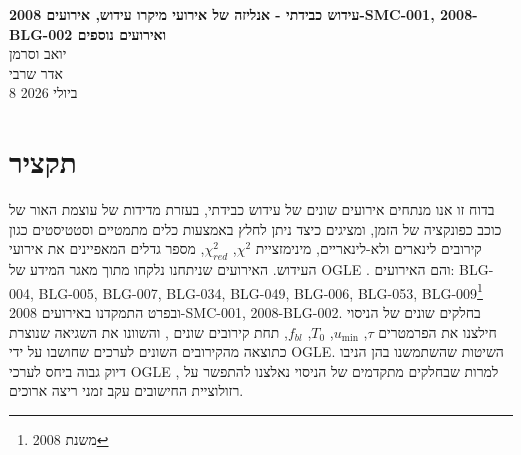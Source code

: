 \documentclass{article}
\begin{document}
\noindent
{\LARGE \textbf{
עידוש כבידתי - אנליזה של אירועי מיקרו עידוש, אירועים
\mbox{2008-SMC-001},
\mbox{2008-BLG-002}
ואירועים נוספים 
}} \\[0.5cm]
{\large יואב וסרמן
\noindent\\
אדר שרבי}\\
{\large 8 ביולי 2026}\\

\section*{תקציר}
בדוח זו אנו מנתחים אירועים שונים של עידוש כבידתי, בעזרת מדידות של עוצמת האור של כוכב כפונקציה של הזמן, ומציגים כיצד ניתן לחלץ באמצעות כלים מתמטיים וסטטיסטים
כגון קירובים לינארים ולא-לינאריים, מינימזציית
$\chi^2$,
$\chi^2_{red}$,
 מספר גדלים המאפיינים את אירועי העידוש.
האירועים שניתחנו נלקחו מתוך מאגר המידע של
\textenglish{OGLE}
\cite{ogle_general_data}.
והם האירועים:
\mbox{BLG-004}, \mbox{BLG-005}, \mbox{BLG-007}, \mbox{BLG-034}, \mbox{BLG-049}, \mbox{BLG-006}, 
\mbox{BLG-053}, \mbox{BLG-009}\footnote{משנת 2008}
ובפרט התמקדנו באירועים
\mbox{2008-SMC-001},
\mbox{2008-BLG-002}.
בחלקים שונים של הניסוי חילצנו את הפרמטרים 
$\tau$, $u_{\min}$, $T_0$, $f_{bl}$,
תחת קירובים שונים , והשוונו את השגיאה שנוצרת כתוצאה מהקירובים השונים לערכים שחושבו על ידי 
\textenglish{OGLE}.
השיטות שהשתמשנו בהן הניבו דיוק גבוה ביחס לערכי \textenglish{OGLE} 
, למרות שבחלקים מתקדמים של הניסוי נאלצנו להתפשר על רזולוציית החישובים עקב זמני ריצה ארוכים.
\end{document}

